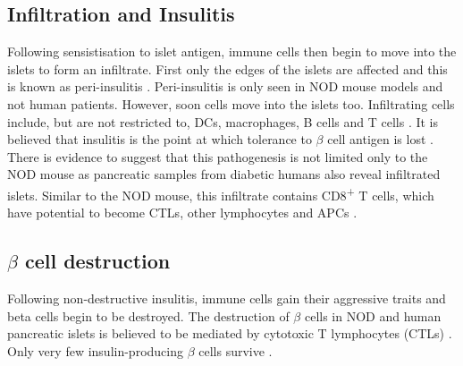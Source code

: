 




\subsection{Infiltration and Insulitis}

Following sensistisation to islet antigen, immune cells then begin to move into the islets to form an infiltrate.
First only the edges of the islets are affected and this is known as peri-insulitis \citep{Thomas2000}.
Peri-insulitis is only seen in NOD mouse models and not human patients.
However, soon cells move into the islets too.
Infiltrating cells include, but are not restricted to, DCs, macrophages, B cells and T cells \citep{Brodie2008}.
It is believed that insulitis is the point at which tolerance to $\beta$ cell antigen is lost \citep{Thomas2000}.
There is evidence to suggest that this pathogenesis is not limited only to the NOD mouse as pancreatic samples from diabetic humans also reveal infiltrated islets.
Similar to the NOD mouse, this infiltrate contains CD8\textsuperscript{+} T cells, which have potential to become CTLs, other lymphocytes and APCs \citep{Hanafusa2008}.

\subsection{$\beta$ cell destruction}

Following non-destructive insulitis, immune cells gain their aggressive traits and beta cells begin to be destroyed.
The destruction of $\beta$ cells in NOD and human pancreatic islets is believed to be mediated by cytotoxic T lymphocytes (CTLs) \citep{Thomas2000, Brodie2008, Hanafusa2008}.
Only very few insulin-producing $\beta$ cells survive \citep{Oram2014, Veld2014}.



